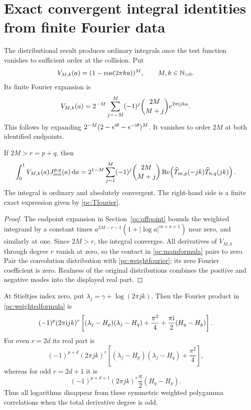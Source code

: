 \section{Exact convergent integral identities from finite Fourier data}\label{pc:weighted}
The distributional result produces ordinary integrals once the test function vanishes to sufficient order at the collision. Put
\begin{equation}\label{pc:weight}
 V_{M,k}(a)=(1-\cos(2\pi k a))^M,
 \qquad M,k\in\mathbb N_{>0}.
\end{equation}
Its finite Fourier expansion is
\begin{equation}\label{pc:weightfourier}
 V_{M,k}(a)=2^{-M}\sum_{j=-M}^M(-1)^j
              \binom{2M}{M+j}e^{2\pi\mathrm{i} jk a}.
\end{equation}
This follows by expanding $2^{-M}(2-e^{\mathrm{i}\theta}-e^{-\mathrm{i}\theta})^M$. It vanishes to order $2M$ at both identified endpoints.

\begin{theorem}\label{pc:weightedtheorem}
If $2M>r=p+q$, then
\begin{align}\label{pc:weightedformula}
 \int_0^1 V_{M,k}(a)J_{mn}^{p,q}(a)\,\mathrm d a
 =2^{1-M}\sum_{j=1}^M(-1)^j\binom{2M}{M+j}
 \operatorname{Re}\!\left(\widehat T_{m,p}(-jk)\widehat T_{n,q}(jk)\right).
\end{align}
The integral is ordinary and absolutely convergent. The right-hand side is a finite exact expression given by \eqref{pc:Tfourier}.
\end{theorem}
\begin{proof}
The endpoint expansion in Section~\ref{pc:offpoint} bounds the weighted integrand by a constant times
$a^{2M-r-1}(1+|\log a|^{m+n+1})$ near zero, and similarly at one. Since $2M>r$, the integral converges. All derivatives of $V_{M,k}$ through degree $r$ vanish at zero, so the contact in \eqref{pc:mainformula} pairs to zero. Pair the convolution distribution with \eqref{pc:weightfourier}; its zero Fourier coefficient is zero. Realness of the original distributions combines the positive and negative modes into the displayed real part.
\end{proof}
At Stieltjes index zero, put $\lambda_j=\gamma+\log(2\pi jk)$. Then the Fourier product in \eqref{pc:weightedformula} is
\begin{equation}\label{pc:polyfourierproduct}
 (-1)^p(2\pi\mathrm{i} jk)^r
 \left[(\lambda_j-H_p)(\lambda_j-H_q)+\frac{\pi^2}{4}
                  +\frac{\pi\mathrm{i}}{2}(H_q-H_p)\right].
\end{equation}
For even $r=2d$ its real part is
\[
 (-1)^{p+d}(2\pi jk)^r
 \left[(\lambda_j-H_p)(\lambda_j-H_q)+\frac{\pi^2}{4}\right],
\]
whereas for odd $r=2d+1$ it is
\[
 (-1)^{p+d+1}(2\pi jk)^r\frac\pi2(H_q-H_p).
\]
Thus all logarithms disappear from these symmetric weighted polygamma correlations when the total derivative degree is odd.

